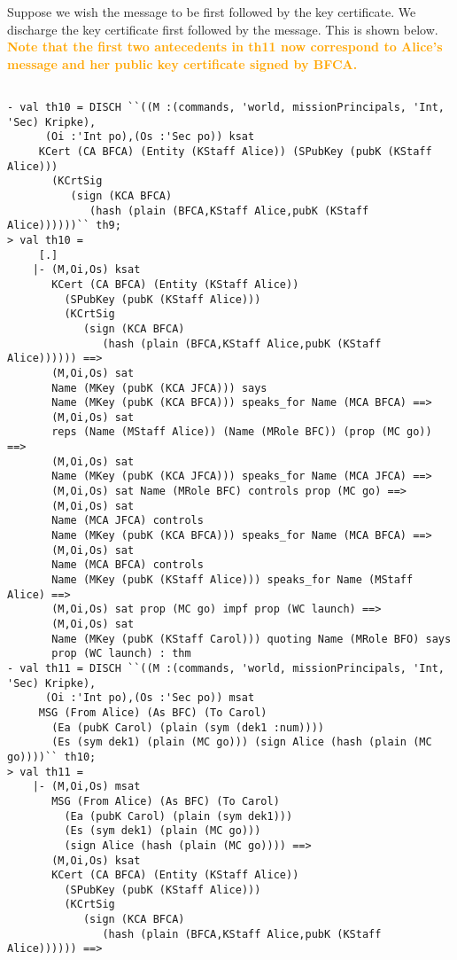 \documentclass[10pt,twoside]{article}
\newcommand{\standout}[1]{\textcolor{orange}{#1}}
\begin{document}
Suppose we wish the message to be first followed by the key
certificate. We discharge the key certificate first followed by the
message. This is shown below. \standout{\textbf{Note that the first
    two antecedents in th11 now correspond to Alice's message and her
    public key certificate signed by BFCA.}}
\begin{session}
  \begin{scriptsize}
\begin{verbatim}

- val th10 = DISCH ``((M :(commands, 'world, missionPrincipals, 'Int, 'Sec) Kripke),
      (Oi :'Int po),(Os :'Sec po)) ksat
     KCert (CA BFCA) (Entity (KStaff Alice)) (SPubKey (pubK (KStaff Alice)))
       (KCrtSig
          (sign (KCA BFCA)
             (hash (plain (BFCA,KStaff Alice,pubK (KStaff Alice))))))`` th9;
> val th10 =
     [.]
    |- (M,Oi,Os) ksat
       KCert (CA BFCA) (Entity (KStaff Alice))
         (SPubKey (pubK (KStaff Alice)))
         (KCrtSig
            (sign (KCA BFCA)
               (hash (plain (BFCA,KStaff Alice,pubK (KStaff Alice)))))) ==>
       (M,Oi,Os) sat
       Name (MKey (pubK (KCA JFCA))) says
       Name (MKey (pubK (KCA BFCA))) speaks_for Name (MCA BFCA) ==>
       (M,Oi,Os) sat
       reps (Name (MStaff Alice)) (Name (MRole BFC)) (prop (MC go)) ==>
       (M,Oi,Os) sat
       Name (MKey (pubK (KCA JFCA))) speaks_for Name (MCA JFCA) ==>
       (M,Oi,Os) sat Name (MRole BFC) controls prop (MC go) ==>
       (M,Oi,Os) sat
       Name (MCA JFCA) controls
       Name (MKey (pubK (KCA BFCA))) speaks_for Name (MCA BFCA) ==>
       (M,Oi,Os) sat
       Name (MCA BFCA) controls
       Name (MKey (pubK (KStaff Alice))) speaks_for Name (MStaff Alice) ==>
       (M,Oi,Os) sat prop (MC go) impf prop (WC launch) ==>
       (M,Oi,Os) sat
       Name (MKey (pubK (KStaff Carol))) quoting Name (MRole BFO) says
       prop (WC launch) : thm
- val th11 = DISCH ``((M :(commands, 'world, missionPrincipals, 'Int, 'Sec) Kripke),
      (Oi :'Int po),(Os :'Sec po)) msat
     MSG (From Alice) (As BFC) (To Carol)
       (Ea (pubK Carol) (plain (sym (dek1 :num))))
       (Es (sym dek1) (plain (MC go))) (sign Alice (hash (plain (MC go))))`` th10;
> val th11 =
    |- (M,Oi,Os) msat
       MSG (From Alice) (As BFC) (To Carol)
         (Ea (pubK Carol) (plain (sym dek1)))
         (Es (sym dek1) (plain (MC go)))
         (sign Alice (hash (plain (MC go)))) ==>
       (M,Oi,Os) ksat
       KCert (CA BFCA) (Entity (KStaff Alice))
         (SPubKey (pubK (KStaff Alice)))
         (KCrtSig
            (sign (KCA BFCA)
               (hash (plain (BFCA,KStaff Alice,pubK (KStaff Alice)))))) ==>

\end{verbatim}
\end{scriptsize}
\end{session}
\end{document}

